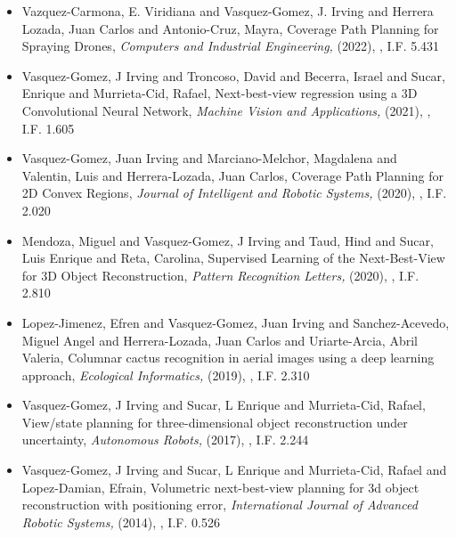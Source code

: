 \begin{itemize} 
\item Vazquez-Carmona, E. Viridiana and Vasquez-Gomez, J. Irving and Herrera Lozada, Juan Carlos and Antonio-Cruz, Mayra, Coverage Path Planning for Spraying Drones,\textit{ Computers and Industrial Engineering,} (2022), \href{https://doi.org/10.1016/j.cie.2022.108125} {\faFilePdfO}, I.F. 5.431 
\item Vasquez-Gomez, J Irving and Troncoso, David and Becerra, Israel and Sucar, Enrique and Murrieta-Cid, Rafael, Next-best-view regression using a 3D Convolutional Neural Network,\textit{ Machine Vision and Applications,} (2021), \href{https://doi.org/10.1007/s00138-020-01166-2} {\faFilePdfO}, I.F. 1.605 
\item Vasquez-Gomez, Juan Irving and Marciano-Melchor, Magdalena and Valentin, Luis and Herrera-Lozada, Juan Carlos, Coverage Path Planning for 2D Convex Regions,\textit{ Journal of Intelligent and Robotic Systems,} (2020), \href{https://doi.org/10.1007/s10846-019-01024-y} {\faFilePdfO}, I.F. 2.020 
\item Mendoza, Miguel and Vasquez-Gomez, J Irving and Taud, Hind and Sucar, Luis Enrique and Reta, Carolina, Supervised Learning of the Next-Best-View for 3D Object Reconstruction,\textit{ Pattern Recognition Letters,} (2020), \href{https://doi.org/10.1016/j.patrec.2020.02.024} {\faFilePdfO}, I.F. 2.810 
\item Lopez-Jimenez, Efren and Vasquez-Gomez, Juan Irving and Sanchez-Acevedo, Miguel Angel and Herrera-Lozada, Juan Carlos and Uriarte-Arcia, Abril Valeria, Columnar cactus recognition in aerial images using a deep learning approach,\textit{ Ecological Informatics,} (2019), \href{https://doi.org/10.1016/j.ecoinf.2019.05.005} {\faFilePdfO}, I.F. 2.310 
\item Vasquez-Gomez, J Irving and Sucar, L Enrique and Murrieta-Cid, Rafael, View/state planning for three-dimensional object reconstruction under uncertainty,\textit{ Autonomous Robots,} (2017), \href{https://doi.org/10.1007/s10514-015-9531-3} {\faFilePdfO}, I.F. 2.244 
\item Vasquez-Gomez, J Irving and Sucar, L Enrique and Murrieta-Cid, Rafael and Lopez-Damian, Efrain, Volumetric next-best-view planning for 3d object reconstruction with positioning error,\textit{ International Journal of Advanced Robotic Systems,} (2014), \href{https://doi.org/10.5772%2F58759} {\faFilePdfO}, I.F. 0.526 
\end{itemize} 
